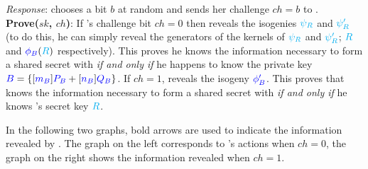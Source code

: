 \begin{center}
\end{center}

\noindent
\emph{Response}: \alice chooses a bit $b$ at random and sends her challenge $ch = b$ to \bob.\\

\noindent
\textbf{Prove($sk$, $ch$)}: If \alice's challenge bit $ch = 0$ then \bob reveals the isogenies $\textcolor{cyan}{\psi_R}$ and $\textcolor{cyan}{\psi'_R}$ (to do this, he can simply reveal the generators of the kernels of $\textcolor{cyan}{\psi_R}$ and $\textcolor{cyan}{\psi'_R}$; $\textcolor{cyan}{R}$ and $\textcolor{blue}{\phi_B}(\textcolor{cyan}{R})$ respectively). This proves he knows the information necessary to form a shared secret with \randall \emph{if and only if} he happens to know the private key $\textcolor{blue}{B} = \{[\textcolor{blue}{m_B}]\textcolor{blue}{P_B} + [\textcolor{blue}{n_B}]\textcolor{blue}{Q_B}\}$. If $ch = 1$, \bob reveals the isogeny $\textcolor{blue}{\phi'_B}$. This proves that \bob knows the information necessary to form a shared secret with \randall \emph{if and only if} he knows \randall's secret key $\textcolor{cyan}{R}$.

In the following two graphs, bold arrows are used to indicate the information revealed by \bob. The graph on the left corresponds to \bob's actions when $ch = 0$, the graph on the right shows the information revealed when $ch = 1$.

